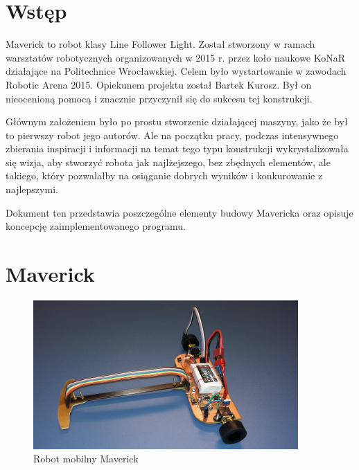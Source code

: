 \documentclass[12pt,a4paper]{article}
\begin{document}
\maketitle %
\tableofcontents %
\newpage %


\section{Wstęp}
Maverick to robot klasy Line Follower Light. Został stworzony w ramach warsztatów robotycznych organizowanych w 2015 r. przez koło naukowe \mbox{KoNaR} działające na Politechnice Wrocławskiej. Celem było wystartowanie w zawodach Robotic Arena 2015. Opiekunem projektu został Bartek Kurosz. Był on nieocenioną pomocą i znacznie przyczynił się do sukcesu tej konstrukcji.

Głównym założeniem było po prostu stworzenie działającej maszyny, jako że był to pierwszy robot jego autorów. Ale na początku pracy, podczas intensywnego zbierania inspiracji i informacji na temat tego typu konstrukcji wykrystalizowała się wizja, aby stworzyć robota jak najlżejszego, bez zbędnych elementów, ale takiego, który pozwalałby na osiąganie dobrych wyników i konkurowanie z najlepszymi.

Dokument ten przedstawia poszczególne elementy budowy Mavericka oraz opisuje koncepcję zaimplementowanego programu.


\section{Maverick}

\begin{figure}[tp]
\centering
\includegraphics[width=0.9\textwidth]{figures/6.jpg}
\caption{Robot mobilny Maverick \label{fig:mav}}
\end{figure}
\end{document}
